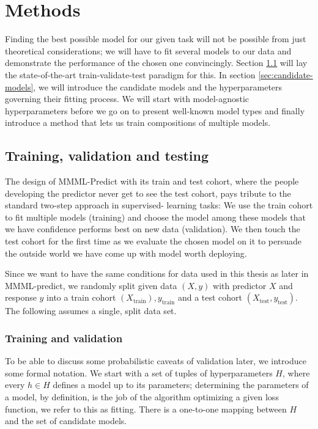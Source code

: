 \chapter{Methods} \label{chap:methods}

Finding the best possible model for our given task will not be possible from just theoretical 
considerations; we will have to fit several models to our data and demonstrate the performance of 
the chosen one convincingly. Section \ref{sec:train-val-test} will lay the state-of-the-art 
train-validate-test paradigm for this. In section \ref{sec:candidate-models}, we will introduce 
the candidate models and the hyperparameters governing their fitting process. We will start with 
model-agnostic hyperparameters before we go on to present well-known model types and finally 
introduce a method that lets us train compositions of multiple models.

\section{Training, validation and testing}\label{sec:train-val-test}

The design of MMML-Predict with its train and test cohort, where the people developing the predictor 
never get to see the test cohort, pays tribute to the standard two-step approach in supervised-
learning tasks: We use the train cohort to fit multiple models (training) and choose the model
among these models that we have confidence performs best on new data (validation). We then touch 
the test cohort for the first time as we evaluate the chosen model on it to persuade the outside 
world we have come up with model worth deploying.

Since we want to have the same conditions for data used in this thesis as later in MMML-predict,
we randomly split given data $(X, y)$ with predictor $X$ and response $y$ into 
a train cohort $(X_\text{train}), y_\text{train}$ and a test cohort $(X_\text{test}, y_\text{test})$.
The following assumes a single, split data set.

\subsection{Training and validation}

To be able to discuss some probabilistic caveats of validation later, we introduce some formal 
notation. We start with a set of tuples of hyperparameters $H$, where every $h \in H$ defines a model
up to its parameters; determining the parameters of a model, by definition, is the job of the 
algorithm optimizing a given loss function, we refer to this as fitting. There is a one-to-one 
mapping between $H$ and the set of candidate models.

